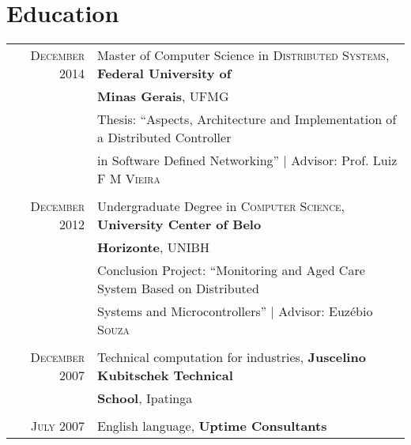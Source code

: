 \documentclass[a4paper,10pt]{article} %
\begin{document}

\section{Education}

\begin{tabular}{rl}
\textsc{December} 2014 & Master of Computer Science in
\textsc{Distributed Systems},  \textbf{Federal University of}
\\ & \textbf{Minas Gerais}, UFMG \\
& Thesis: ``Aspects, Architecture and Implementation of a Distributed
Controller \\ & in Software Defined Networking''
| \small Advisor: Prof. Luiz \textsc{F M Vieira} \\
&\\


\textsc{December} 2012& Undergraduate Degree in
\textsc{}\textsc{Computer Science},
\normalsize\textbf{ University Center of Belo}
\\ & \textbf{Horizonte}, UNIBH \\
& Conclusion Project: ``Monitoring and Aged Care System Based on
Distributed
\\ & Systems and Microcontrollers''
| \small Advisor: Euzébio \textsc{Souza} \\
&\\


\textsc{December} 2007 &Technical computation for industries,
\textbf{Juscelino Kubitschek Technical}
\\ & \textbf{School}, Ipatinga \\
&\\


\textsc{July} 2007 & English language, \textbf{Uptime Consultants}
\end{tabular}
\end{document}
